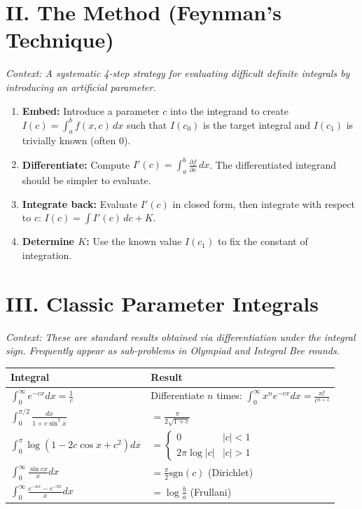 \documentclass[11pt, a4paper]{article}
\begin{document}
\section*{\color{primary} II. The Method (Feynman's Technique)}

\textit{\small Context: A systematic 4-step strategy for evaluating difficult definite integrals by introducing an artificial parameter.}

\begin{enumerate}[leftmargin=*, nosep, itemsep=2pt]
    \item \textbf{\color{accent}Embed:} Introduce a parameter $c$ into the integrand to create $I(c) = \int_a^b f(x,c)\,dx$ such that $I(c_0)$ is the target integral and $I(c_1)$ is trivially known (often $0$).
    \item \textbf{\color{accent}Differentiate:} Compute $I'(c) = \int_a^b \frac{\partial f}{\partial c}\,dx$. The differentiated integrand should be simpler to evaluate.
    \item \textbf{\color{accent}Integrate back:} Evaluate $I'(c)$ in closed form, then integrate with respect to $c$: $I(c) = \int I'(c)\,dc + K$.
    \item \textbf{\color{accent}Determine $K$:} Use the known value $I(c_1)$ to fix the constant of integration.
\end{enumerate}

\vspace{0.3cm}

\section*{\color{primary} III. Classic Parameter Integrals}

\textit{\small Context: These are standard results obtained via differentiation under the integral sign. Frequently appear as sub-problems in Olympiad and Integral Bee rounds.}

\begin{center}
\begin{tabular}{@{}p{} p{}@{}}
\toprule
\textbf{Integral} & \textbf{Result} \\
\midrule
$\int_0^\infty e^{-cx} dx = \frac{1}{c}$ & Differentiate $n$ times: $\int_0^\infty x^n e^{-cx} dx = \frac{n!}{c^{n+1}}$ \\
$\int_0^{\pi/2} \frac{dx}{1+c\sin^2 x}$ & $= \frac{\pi}{2\sqrt{1+c}}$ \\
$\int_0^\pi \log(1-2c\cos x+c^2)dx$ & $= \begin{cases} 0 & |c|<1 \\ 2\pi\log|c| & |c|>1 \end{cases}$ \\
$\int_0^\infty \frac{\sin cx}{x} dx$ & $= \frac{\pi}{2}\text{sgn}(c)$ (Dirichlet) \\
$\int_0^\infty \frac{e^{-ax}-e^{-bx}}{x} dx$ & $= \log\frac{b}{a}$ (Frullani) \\
\bottomrule
\end{tabular}
\end{center}
\end{document}
